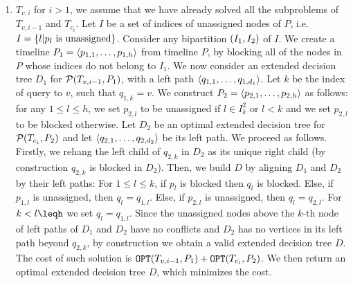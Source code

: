 \begin{enumerate}
        \item $T_{v,i}$ for $i>1$, we assume that we have already solved all the subproblems of $T_{v,i-1}$ and $T_{c_i}$. Let $I$ be a set of indices of unassigned nodes of $P$, i.e. $I=\mathopen{}\left\{ l | p_l \text{ is unassigned} \right\}$. Consider any bipartition $\mathopen{}\left( I_1, I_2 \right)$ of $I$. We create a timeline $P_1=\mathopen{}\langle p_{1,1},\dots,p_{1,h} \rangle$ from timeline $P$, by blocking all of the nodes in $P$ whose indices do not belong to $I_1$. We now consider an extended decision tree $D_1$ for $\mathcal{P}\mathopen{}\left( T_{v,i-1}, P_1 \right)$, with a left path $\mathopen{}\langle q_{1,1},\dots,q_{1,d_1} \rangle$. Let $k$ be the index of query to $v$, such that $q_{1,k}=v$. We construct $P_2=\mathopen{}\langle p_{2,1},\dots, p_{2,h} \rangle$ as follows: for any $1\leq l\leq h$, we set $p_{2,l}$ to be unassigned if $l\in I_k^2$ or $l < k$ and we set $p_{2,l}$ to be blocked otherwise. Let $D_2$ be an optimal extended decision tree for $\mathcal{P}\mathopen{}\left( T_{c_i}, P_2 \right)$ and let $\mathopen{}\langle q_{2,1},\dots,q_{2,d_2} \rangle$ be its left path. We proceed as follows. Firstly, we rehang the left child of $q_{2,k}$ in $D_2$ as its unique right child (by construction $q_{2,k}$ is blocked in $D_2$). Then, we build $D$ by aligning $D_1$ and $D_2$ by their left paths: For $1\leq l \leq k$, if $p_l$ is blocked then $q_l$ is blocked. Else, if $p_{1,l}$ is unassigned, then $q_l=q_{1,l}$. Else, if  $p_{2,l}$ is unassigned, then $q_l=q_{2,l}$. For $k<l\leqh$ we set $q_l=q_{1,l}$. Since the unassigned nodes above the $k$-th node of left paths of $D_1$ and $D_2$ have no conflicts and $D_2$ has no vertices in its left path beyond $q_{2,k}$, by construction we obtain a valid extended decision tree $D$. The cost of such solution is $\texttt{OPT}\mathopen{}\left( T_{v,i-1}, P_1 \right)+\texttt{OPT}\mathopen{}\left( T_{c_i}, P_2 \right)$. We then return an optimal extended decision tree $D$, which minimizes the cost. 
    \end{enumerate}

 








